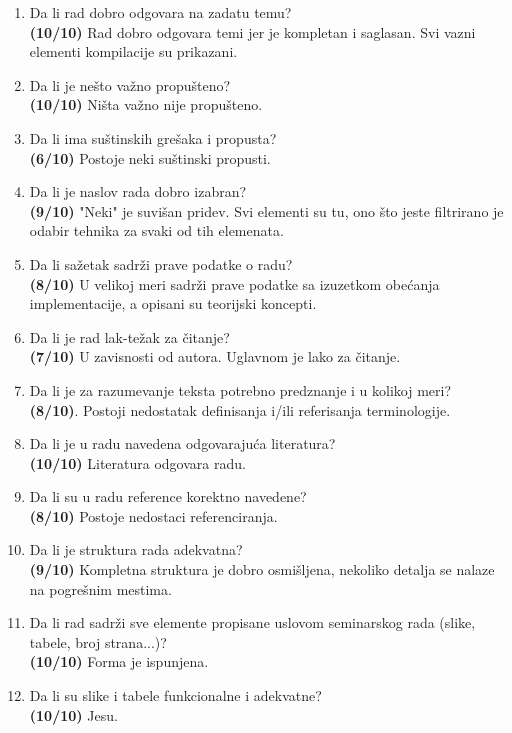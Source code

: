 \documentclass[a4paper]{report}
\begin{document}
\begin{enumerate}
\item Da li rad dobro odgovara na zadatu temu?\\
\textbf{(10/10)} Rad dobro odgovara temi jer je kompletan i saglasan. Svi vazni elementi kompilacije su prikazani.
\item Da li je nešto važno propušteno?\\
\textbf{(10/10)} Ništa važno nije propušteno.
\item Da li ima suštinskih grešaka i propusta?\\
\textbf{(6/10)} Postoje neki suštinski propusti.
\item Da li je naslov rada dobro izabran?\\
\textbf{(9/10)} "Neki" je suvišan pridev. Svi elementi su tu, ono što jeste filtrirano je odabir tehnika za svaki od tih elemenata.
\item Da li sažetak sadrži prave podatke o radu?\\
\textbf{(8/10)} U velikoj meri sadrži prave podatke sa izuzetkom obećanja implementacije, a opisani su teorijski koncepti.
\item Da li je rad lak-težak za čitanje?\\
\textbf{(7/10)} U zavisnosti od autora. Uglavnom je lako za čitanje.
\item Da li je za razumevanje teksta potrebno predznanje i u kolikoj meri?\\
\textbf{(8/10)}. Postoji nedostatak definisanja i/ili referisanja terminologije.
\item Da li je u radu navedena odgovarajuća literatura?\\
\textbf{(10/10)} Literatura odgovara radu.
\item Da li su u radu reference korektno navedene?\\
\textbf{(8/10)} Postoje nedostaci referenciranja.
\item Da li je struktura rada adekvatna?\\
\textbf{(9/10)} Kompletna struktura je dobro osmišljena, nekoliko detalja se nalaze na pogrešnim mestima.
\item Da li rad sadrži sve elemente propisane uslovom seminarskog rada (slike, tabele, broj strana...)?\\
\textbf{(10/10)} Forma je ispunjena.
\item Da li su slike i tabele funkcionalne i adekvatne?\\
\textbf{(10/10)} Jesu.
\end{enumerate}
\end{document}
